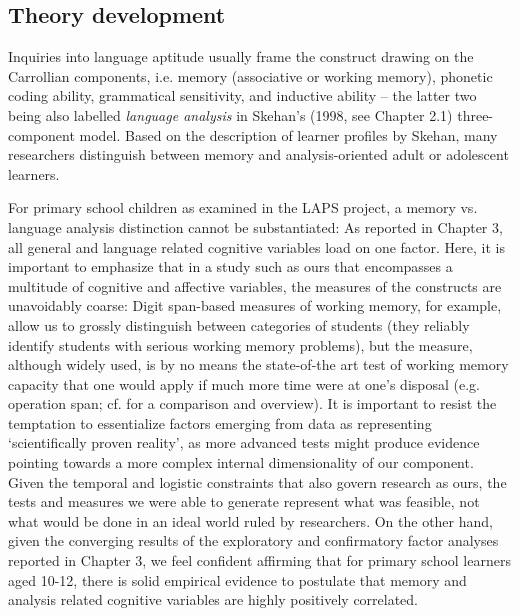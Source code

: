\documentclass[output=paper]{langsci/langscibook}
\begin{document}
\subsection{Theory development}

Inquiries into language aptitude usually frame the construct drawing on the Carrollian components, i.e. memory (associative or working memory), phonetic coding ability, grammatical sensitivity, and inductive ability – the latter two being also labelled \textit{language analysis} in Skehan’s (1998, see Chapter 2.1) three-component model. Based on the description of learner profiles by Skehan, many researchers distinguish between memory and analysis-oriented adult or adolescent learners. 

For primary school children as examined in the LAPS project, a memory vs. language analysis distinction cannot be substantiated: As reported in Chapter 3, all general and language related cognitive variables load on one factor. Here, it is important to emphasize that in a study such as ours that encompasses a multitude of cognitive and affective variables, the measures of the constructs are unavoidably coarse: Digit span-based measures of working memory, for example, allow us to grossly distinguish between categories of students (they reliably identify students with serious working memory problems), but the measure, although widely used, is by no means the state-of-the art test of working memory capacity that one would apply if much more time were at one’s disposal (e.g. operation span; cf. \citealt{ConwayEtAl2005} for a comparison and overview). It is important to resist the temptation to essentialize factors emerging from data as representing ‘scientifically proven reality’, as more advanced tests might produce evidence pointing towards a more complex internal dimensionality of our component. Given the temporal and logistic constraints that also govern research as ours, the tests and measures we were able to generate represent what was feasible, not what would be done in an ideal world ruled by researchers. On the other hand, given the converging results of the exploratory and confirmatory factor analyses reported in Chapter 3, we feel confident affirming that for primary school learners aged 10-12, there is solid empirical evidence to postulate that memory and analysis related cognitive variables are highly positively correlated.
\end{document}
